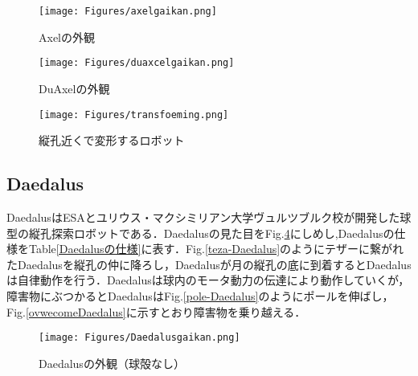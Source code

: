 \documentclass[a4paper,11pt,dvipdfmx.uplatex]{jsarticle}
\begin{document}
\begin{figure}[htbp]
\centering
  \texttt{[image: Figures/axelgaikan.png]}
  \caption{Axelの外観\cite{Axel}}
  \label{axel}
\end{figure}

\begin{figure}[htbp]
\centering
  \texttt{[image: Figures/duaxcelgaikan.png]}
  \caption{DuAxelの外観\cite{DuAxel}}
  \label{Duaxel}
\end{figure}

\begin{figure}[htbp]
\centering
  \texttt{[image: Figures/transfoeming.png]}
  \caption{縦孔近くで変形するロボット\cite{DuAxel}}
  \label{henkei}
\end{figure}


\subsection{\bf Daedalus}
DaedalusはESAとユリウス・マクシミリアン大学ヴュルツブルク校が開発した球型の縦孔探索ロボットである\cite{DAEDALUS}．Daedalusの見た目をFig.\ref{Daedalus}にしめし,Daedalusの仕様をTable\ref{Daedalusの仕様}に表す．Fig.\ref{teza-Daedalus}のようにテザーに繋がれたDaedalusを縦孔の仲に降ろし，Daedalusが月の縦孔の底に到着するとDaedalusは自律動作を行う．Daedalusは球内のモータ動力の伝達により動作していくが，障害物にぶつかるとDaedalusはFig.\ref{pole-Daedalus}のようにポールを伸ばし，Fig.\ref{ovwecomeDaedalus}に示すとおり障害物を乗り越える．

\begin{figure}[htbp]
\centering
  \texttt{[image: Figures/Daedalusgaikan.png]}
  \caption{Daedalusの外観（球殻なし）\cite{DAEDALUS}}
  \label{Daedalus}
\end{figure}



\begin{table}[htbp]
\centering
\caption{Daedalusの仕様\cite{DAEDALUS}}
\label{Daedalusの仕様}
\end{table}
\end{document}
